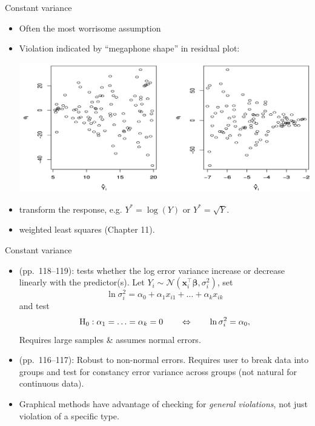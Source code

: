 \documentclass{beamer}
\begin{document}
\begin{frame}{Constant variance}
\begin{itemize}
\item Often the most worrisome assumption
\item<2-> Violation indicated by ``megaphone shape'' in residual plot:

\centerline{\includegraphics[scale=0.25]{plots/res-fit}}
\item<3->  transform the response, e.g. $Y^\ast=\log(Y)$ or $Y^\ast=\sqrt{Y}$.
\item<4->  weighted least squares (Chapter 11).
\end{itemize}
\end{frame}

\begin{frame}{Constant variance}
\begin{itemize}
\item {} (pp.~118--119): tests whether the log error variance increase or decrease linearly with the predictor(s). \pause Let $Y_i\sim\mathcal{N}(\mathbf{x}_i^\top\boldsymbol\beta,\sigma_i^2)$, set 
$$
\ln\sigma_i^2=\alpha_0+\alpha_1 x_{i1}+\ldots+\alpha_k x_{ik}
$$ 
\pause and test 
$$
{\rm H}_0: \alpha_1=\ldots=\alpha_k=0\qquad\Leftrightarrow\qquad\ln\sigma_i^2=\alpha_0,
$$
\pause Requires large samples \& assumes normal errors.
\item\pause {} (pp.~116--117): Robust to non-normal errors. Requires user to break data into groups and test for constancy error variance across groups (not natural for continuous data).
\item\pause Graphical methods have advantage of checking for \textit{general violations}, not just violation of a specific type.
\end{itemize}
\end{frame}
\end{document}
